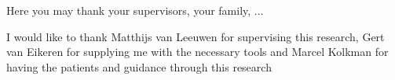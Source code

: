 


\begin{acknowledgements}

Here you may thank your supervisors, your family, ...

I would like to thank Matthijs van Leeuwen for supervising this research, Gert van Eikeren for supplying me with the necessary tools and Marcel Kolkman for having the patients and guidance through this research 

\end{acknowledgements}
